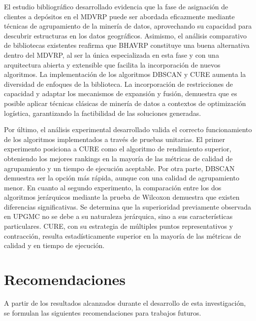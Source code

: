 El estudio bibliogr\'afico desarrollado evidencia que la fase de asignaci\'on de clientes a dep\'ositos en el MDVRP puede ser abordada eficazmente mediante t\'ecnicas de agrupamiento de la miner\'ia de datos, aprovechando su capacidad para descubrir estructuras en los datos geogr\'aficos. Asimismo, el an\'alisis comparativo de bibliotecas existentes reafirma que BHAVRP constituye una buena alternativa dentro del MDVRP, al ser la \'unica especializada en esta fase y con una arquitectura abierta y extensible que facilita la incorporaci\'on de nuevos algoritmos. La implementaci\'on de los algoritmos DBSCAN y CURE aumenta la diversidad de enfoques de la biblioteca. La incorporaci\'on de restricciones de capacidad y adaptar los mecanismos de expansi\'on y fusi\'on, demuestra que es posible aplicar t\'ecnicas cl\'asicas de miner\'ia de datos a contextos de optimizaci\'on log\'istica, garantizando la factibilidad de las soluciones generadas.

Por \'ultimo, el an\'alisis experimental desarrollado valida el correcto funcionamiento de los algoritmos implementados a trav\'es de pruebas unitarias. El primer experimento posiciona a CURE como el algoritmo de rendimiento superior, obteniendo los mejores rankings en la mayor\'ia de las m\'etricas de calidad de agrupamiento y un tiempo de ejecuci\'on aceptable. Por otra parte, DBSCAN demuestra ser la opci\'on m\'as r\'apida, aunque con una calidad de agrupamiento menor. En cuanto al segundo experimento, la comparaci\'on entre los dos algoritmos jer\'arquicos mediante la prueba de Wilcoxon demuestra que existen diferencias significativas. Se determina que la superioridad previamente observada en UPGMC no se debe a su naturaleza jer\'arquica, sino a sus caracter\'isticas particulares. CURE, con su estrategia de m\'ultiples puntos representativos y contracci\'on, resulta estad\'isticamente superior en la mayor\'ia de las m\'etricas de calidad y en tiempo de ejecuci\'on.

\chapter*{Recomendaciones}

A partir de los resultados alcanzados durante el desarrollo de esta investigaci\'on, se formulan las siguientes recomendaciones para trabajos futuros.

